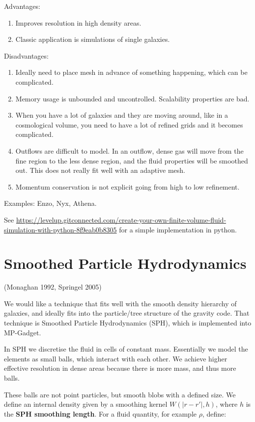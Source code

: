\documentclass[12pt]{article}
\begin{document}
Advantages:
\begin{enumerate}
\item Improves resolution in high density areas.
\item Classic application is simulations of single galaxies.
 \end{enumerate}
Disadvantages:
\begin{enumerate}
\item Ideally need to place mesh in advance of something happening, which can be complicated.
\item Memory usage is unbounded and uncontrolled. Scalability properties are bad.
\item When you have a lot of galaxies and they are moving around, like in a cosmological volume, you need to have a lot of refined grids and it becomes complicated.
\item Outflows are difficult to model. In an outflow, dense gas will move from the fine region to the less dense region, and the fluid properties will be smoothed out. This does not really fit well with an adaptive mesh.
\item Momentum conservation is not explicit going from high to low refinement.
\end{enumerate}

Examples: Enzo, Nyx, Athena.

See \url{https://levelup.gitconnected.com/create-your-own-finite-volume-fluid-simulation-with-python-8f9eab0b8305} for a simple implementation in python.

\section{Smoothed Particle Hydrodynamics}
(Monaghan 1992, Springel 2005)

We would like a technique that fits well with the smooth density hierarchy of galaxies, and ideally fits into the particle/tree structure of the gravity code. That technique is Smoothed Particle Hydrodynamics (SPH), which is implemented into MP-Gadget.

In SPH we discretise the fluid in cells of constant mass. Essentially we model the elements as small balls, which interact with each other. We achieve higher effective resolution in dense areas because there is more mass, and thus more balls.

These balls are not point particles, but smooth blobs with a defined size. We define an internal density given by a smoothing kernel $W(|r - r'|, h)$, where $h$ is the \textbf{SPH smoothing length}. For a fluid quantity, for example $\rho$, define:
\end{document}
